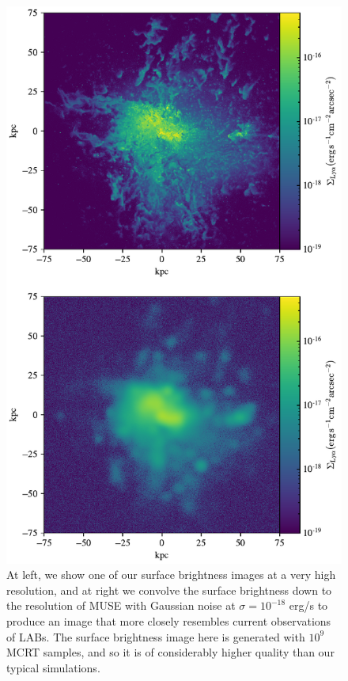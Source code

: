 \begin{figure}
    \centering
    \includegraphics[width=\textwidth,height=0.85\textheight,keepaspectratio]{figures/muse_comparison.pdf}
    \caption{
        At left, we show one of our surface brightness images at a very high resolution, and at right we convolve the surface brightness down to the resolution of MUSE with Gaussian noise at $\sigma=10^{-18}$ erg/s to produce an image that more closely resembles current observations of LABs.
        The surface brightness image here is generated with $10^{9}$ MCRT samples, and so it is of considerably higher quality than our typical simulations.
    }
    \label{fig:MUSE}
\end{figure}


